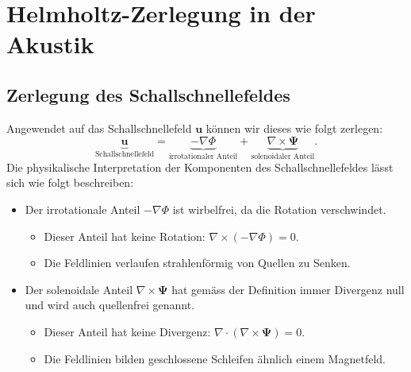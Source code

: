 %
%
%
%
\section{Helmholtz-Zerlegung in der Akustik
\label{helmholtz:section:Helmholtz_Zerlegung_Akustik}}


\subsection{Zerlegung des Schallschnellefeldes
\label{helmholtz:subsection:Zerlegung_Schallschnelle}}
Angewendet auf das Schallschnellefeld $\boldsymbol{u}$ können wir
dieses wie folgt zerlegen:
\begin{equation}
\underbrace{\boldsymbol{u}}_{\displaystyle\text{Schallschnellefeld}}
=
\underbrace{-\nabla \Phi}_{\displaystyle\text{irrotationaler~Anteil}}
+
\underbrace{\nabla \times \boldsymbol{\Psi}}_{\displaystyle\text{solenoidaler~Anteil}}.
\end{equation}
Die physikalische Interpretation der Komponenten des Schallschnellefeldes
lässt sich wie folgt beschreiben:
 
\begin{itemize}
\item Der irrotationale Anteil $-\nabla \Phi$ ist wirbelfrei, da die
Rotation verschwindet.
\begin{itemize}
\item Dieser Anteil hat keine Rotation: $\nabla \times (-\nabla \Phi) = 0$.
\item Die Feldlinien verlaufen strahlenförmig von Quellen zu Senken.
\end{itemize}
 
\item Der solenoidale Anteil $\nabla \times \boldsymbol{\Psi}$ hat gemäss
der Definition immer Divergenz null und wird auch quellenfrei genannt.
\begin{itemize}
\item Dieser Anteil hat keine Divergenz:
$\nabla \cdot (\nabla \times \boldsymbol{\Psi}) = 0$.
\item Die Feldlinien bilden geschlossene Schleifen ähnlich einem Magnetfeld.
\end{itemize}
\end{itemize}


